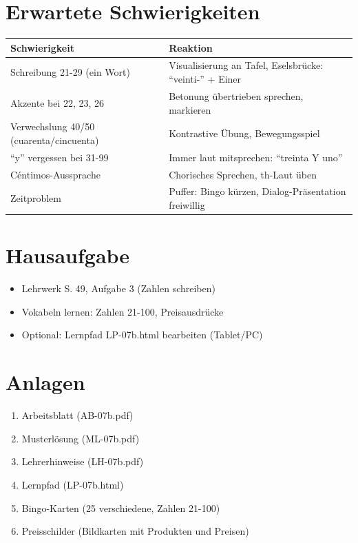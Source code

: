 \documentclass[11pt,a4paper]{article}
\begin{document}
\section{Erwartete Schwierigkeiten}

\begin{tabular}{|p{5cm}|p{8cm}|}
\hline
\textbf{Schwierigkeit} & \textbf{Reaktion} \\
\hline
Schreibung 21-29 (ein Wort) & Visualisierung an Tafel, Eselsbrücke: ``veinti-'' + Einer \\
\hline
Akzente bei 22, 23, 26 & Betonung übertrieben sprechen, markieren \\
\hline
Verwechslung 40/50 (cuarenta/cincuenta) & Kontrastive Übung, Bewegungsspiel \\
\hline
``y'' vergessen bei 31-99 & Immer laut mitsprechen: ``treinta Y uno'' \\
\hline
Céntimos-Aussprache & Chorisches Sprechen, th-Laut üben \\
\hline
Zeitproblem & Puffer: Bingo kürzen, Dialog-Präsentation freiwillig \\
\hline
\end{tabular}

\section{Hausaufgabe}

\begin{itemize}
    \item Lehrwerk S. 49, Aufgabe 3 (Zahlen schreiben)
    \item Vokabeln lernen: Zahlen 21-100, Preisausdrücke
    \item Optional: Lernpfad LP-07b.html bearbeiten (Tablet/PC)
\end{itemize}

\section{Anlagen}

\begin{enumerate}
    \item Arbeitsblatt (AB-07b.pdf)
    \item Musterlösung (ML-07b.pdf)
    \item Lehrerhinweise (LH-07b.pdf)
    \item Lernpfad (LP-07b.html)
    \item Bingo-Karten (25 verschiedene, Zahlen 21-100)
    \item Preisschilder (Bildkarten mit Produkten und Preisen)
\end{enumerate}
\end{document}
